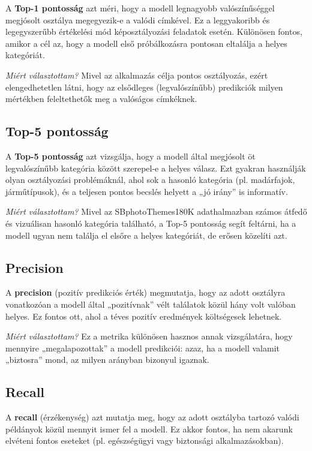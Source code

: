 A \textbf{Top-1 pontosság} azt méri, hogy a modell legnagyobb valószínűséggel megjósolt osztálya megegyezik-e a valódi címkével. Ez a leggyakoribb és legegyszerűbb értékelési mód képosztályozási feladatok esetén. Különösen fontos, amikor a cél az, hogy a modell első próbálkozásra pontosan eltalálja a helyes kategóriát.

\textit{Miért választottam?}  
Mivel az alkalmazás célja pontos osztályozás, ezért elengedhetetlen látni, hogy az elsődleges (legvalószínűbb) predikciók milyen mértékben feleltethetők meg a valóságos címkéknek.

\subsection{Top-5 pontosság}

A \textbf{Top-5 pontosság} azt vizsgálja, hogy a modell által megjósolt öt legvalószínűbb kategória között szerepel-e a helyes válasz. Ezt gyakran használják olyan osztályozási problémáknál, ahol sok a hasonló kategória (pl. madárfajok, járműtípusok), és a teljesen pontos becslés helyett a „jó irány” is informatív.

\textit{Miért választottam?}  
Mivel az SBphotoThemes180K adathalmazban számos átfedő és vizuálisan hasonló kategória található, a Top-5 pontosság segít feltárni, ha a modell ugyan nem találja el elsőre a helyes kategóriát, de erősen közelíti azt.

\subsection{Precision}

A \textbf{precision} (pozitív predikciós érték) megmutatja, hogy az adott osztályra vonatkozóan a modell által „pozitívnak” vélt találatok közül hány volt valóban helyes. Ez fontos ott, ahol a téves pozitív eredmények költségesek lehetnek.

\textit{Miért választottam?}  
Ez a metrika különösen hasznos annak vizsgálatára, hogy mennyire „megalapozottak” a modell predikciói: azaz, ha a modell valamit „biztosra” mond, az milyen arányban bizonyul igaznak.

\subsection{Recall}

A \textbf{recall} (érzékenység) azt mutatja meg, hogy az adott osztályba tartozó valódi példányok közül mennyit ismer fel a modell. Ez akkor fontos, ha nem akarunk elvéteni fontos eseteket (pl. egészségügyi vagy biztonsági alkalmazásokban).

